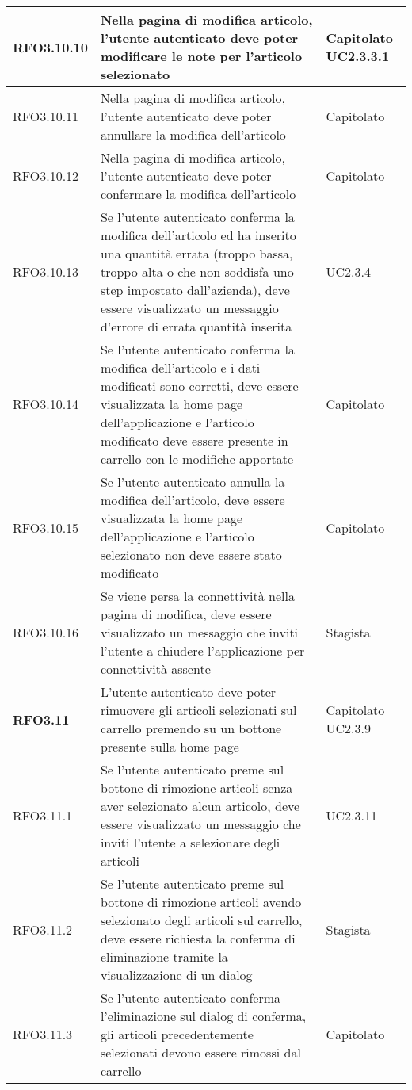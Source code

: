 {\begin{center}
\begin{longtable}{ | >{\centering\arraybackslash}p{2.5cm} | >{\arraybackslash}p{7cm} | >{\centering\arraybackslash}p{2cm} | }
RFO3.10.10 & Nella pagina di modifica articolo, l'utente autenticato deve poter modificare le note per l'articolo selezionato & Capitolato UC2.3.3.1 \\ \hline
RFO3.10.11 & Nella pagina di modifica articolo, l'utente autenticato deve poter annullare la modifica dell'articolo & Capitolato \\ \hline
RFO3.10.12 & Nella pagina di modifica articolo, l'utente autenticato deve poter confermare la modifica dell'articolo & Capitolato \\ \hline
RFO3.10.13 & Se l'utente autenticato conferma la modifica dell'articolo ed ha inserito una quantità errata (troppo bassa, troppo alta o che non soddisfa uno step impostato dall'azienda), deve essere visualizzato un messaggio d'errore di errata quantità inserita & UC2.3.4 \\ \hline
RFO3.10.14 & Se l'utente autenticato conferma la modifica dell'articolo e i dati modificati sono corretti, deve essere visualizzata la home page dell'applicazione e l'articolo modificato deve essere presente in carrello con le modifiche apportate & Capitolato \\ \hline
RFO3.10.15 & Se l'utente autenticato annulla la modifica dell'articolo, deve essere visualizzata la home page dell'applicazione e l'articolo selezionato non deve essere stato modificato & Capitolato \\ \hline
RFO3.10.16 & Se viene persa la connettività nella pagina di modifica, deve essere visualizzato un messaggio che inviti l'utente a chiudere l'applicazione per connettività assente & Stagista \\ \hline
\textbf{RFO3.11} & L'utente autenticato deve poter rimuovere gli articoli selezionati sul carrello premendo su un bottone presente sulla home page & Capitolato UC2.3.9 \\ \hline
RFO3.11.1 & Se l'utente autenticato preme sul bottone di rimozione articoli senza aver selezionato alcun articolo, deve essere visualizzato un messaggio che inviti l'utente a selezionare degli articoli & UC2.3.11 \\ \hline
RFO3.11.2 & Se l'utente autenticato preme sul bottone di rimozione articoli avendo selezionato degli articoli sul carrello, deve essere richiesta la conferma di eliminazione tramite la visualizzazione di un dialog & Stagista \\ \hline
RFO3.11.3 & Se l'utente autenticato conferma l'eliminazione sul dialog di conferma, gli articoli precedentemente selezionati devono essere rimossi dal carrello & Capitolato \\ \hline

\end{longtable}
\end{center}}

